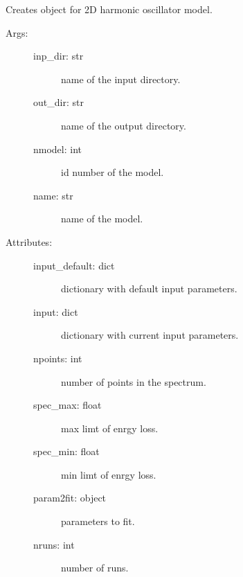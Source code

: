 \documentclass[letterpaper,10pt,english]{sphinxmanual}
\begin{document}
\begin{fulllineitems}
\label{\detokenize{modules/model:phlab.model.double_osc}}
Creates object for 2D harmonic oscillator model.
\begin{description}
\item[{Args:}] \leavevmode\begin{description}
\item[{inp\_dir: str}] \leavevmode
name of the input directory.

\item[{out\_dir: str}] \leavevmode
name of the output directory.

\item[{nmodel: int}] \leavevmode
id number of the model.

\item[{name: str}] \leavevmode
name of the model.

\end{description}

\item[{Attributes:}] \leavevmode\begin{description}
\item[{input\_default: dict}] \leavevmode
dictionary with default input parameters.

\item[{input: dict}] \leavevmode
dictionary with current input parameters.

\item[{npoints: int}] \leavevmode
number of points in the spectrum.

\item[{spec\_max: float}] \leavevmode
max limt of enrgy loss.

\item[{spec\_min: float}] \leavevmode
min limt of enrgy loss.

\item[{param2fit: object}] \leavevmode
parameters to fit.

\item[{nruns: int}] \leavevmode
number of runs.


\end{description}
\end{description}
\end{fulllineitems}
\end{document}
